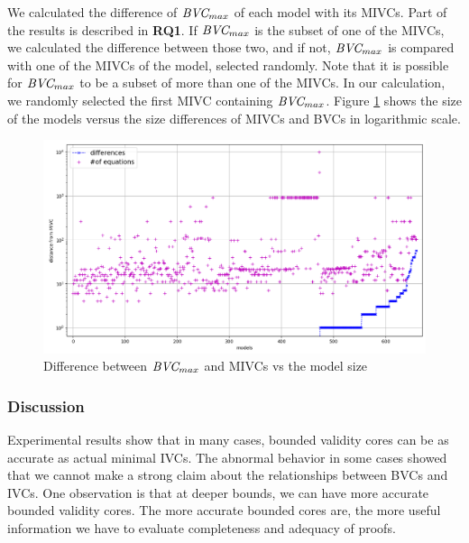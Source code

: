 We calculated the difference of $\textit{BVC} _{max}$ of each model with its MIVCs. Part of the results is described in \textbf{RQ1}. If $\textit{BVC} _{max}$  is the subset of one of the MIVCs, we calculated the difference between those two, and if not, $\textit{BVC} _{max}$  is compared with one of the MIVCs of the model, selected randomly.  Note that it is possible for $\textit{BVC} _{max}$ to be a subset of more than one of the MIVCs. In our calculation, we randomly selected the first MIVC containing $\textit{BVC} _{max}$.
Figure \ref{fig:bvc-size} shows the size of the models versus the size differences of MIVCs and BVCs
in logarithmic scale.


 \begin{figure}
 \centering
  \includegraphics[width=\columnwidth]{figs/bvc_modelsize_yices.png}
  \caption{Difference between $\textit{BVC} _{max}$ and MIVCs vs the model size}
  \vspace{0.1in}
  \label{fig:bvc-size}
\end{figure}

\vspace{0.1in}
\subsubsection{Discussion}
Experimental results show that in many cases, bounded validity cores can be as accurate as actual minimal IVCs. The abnormal behavior in some cases showed that we cannot make a strong claim about the relationships between BVCs and IVCs. One observation is that at deeper bounds, we can have more accurate bounded validity cores. The more accurate bounded cores are, the more useful information we have to evaluate completeness and adequacy of proofs. 

